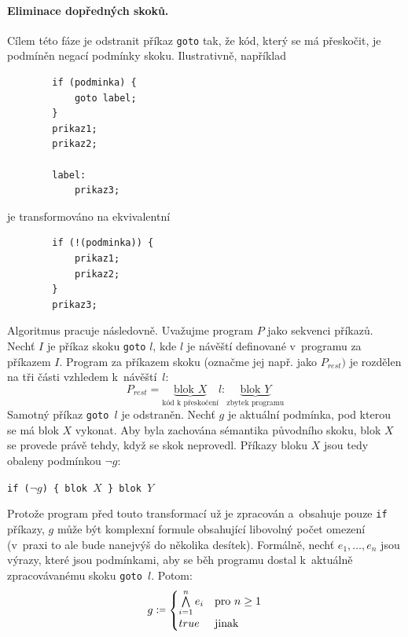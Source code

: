\documentclass[a4paper, 11pt]{article}
\newcommand{\coloneqq}{%
  \mathrel{\mathop:\!\raisebox{0.2ex}{\scalebox{0.8}{$=$}}}
}
\begin{document}
\paragraph{Eliminace dopředných skoků.}
Cílem této fáze je odstranit příkaz \texttt{goto} tak, že kód, který se má přeskočit, je podmíněn negací podmínky skoku.
Ilustrativně, například
\begin{center}
    \begin{verbatim}
        if (podminka) {
            goto label;
        }
        prikaz1;
        prikaz2;

        label:
            prikaz3;
    \end{verbatim}
\end{center}
je transformováno na ekvivalentní
\begin{center}
    \begin{verbatim}
        if (!(podminka)) {
            prikaz1;
            prikaz2;
        }
        prikaz3;        
    \end{verbatim}
\end{center}
Algoritmus pracuje následovně.
Uvažujme program $P$ jako sekvenci příkazů.
Nechť $I$ je příkaz skoku \texttt{goto} $l$, kde $l$ je návěští definované v~programu za příkazem $I$.
Program za příkazem skoku (označme jej např. jako $P_{rest})$ je rozdělen na tři části vzhledem k~návěští~$l$:
\[
    P_{rest} = \underbrace{\text{blok } X}_{\text{kód k přeskočení}} l: \underbrace{\text{blok } Y}_{\text{zbytek programu}}
\]
Samotný příkaz \texttt{goto $l$} je odstraněn.
Nechť $g$ je aktuální podmínka, pod kterou se má blok $X$ vykonat.
Aby byla zachována sémantika původního skoku, blok $X$ se provede právě tehdy, když se skok neprovedl.
Příkazy bloku $X$ jsou tedy obaleny podmínkou $\neg g$:
\begin{center}
    \texttt{if ($\neg g$) \{ \textrm{blok }$X$ \} \textrm{blok }$Y$}
\end{center}
Protože program před touto transformací už je zpracován a~obsahuje pouze \texttt{if} příkazy, $g$ může být komplexní formule obsahující libovolný počet omezení (v~praxi to ale bude nanejvýš do několika desítek).
Formálně, nechť $e_1,\ldots,e_n$ jsou výrazy, které jsou podmínkami, aby se běh programu dostal k~aktuálně zpracovávanému skoku \texttt{goto $l$}.
Potom:
\[
    g \coloneqq
    \begin{cases}
        \bigwedge\limits_{i=1}^{n} e_i & \text{pro } n \geq 1 \\
        true                           & \text{jinak}
    \end{cases}
\]
\end{document}
